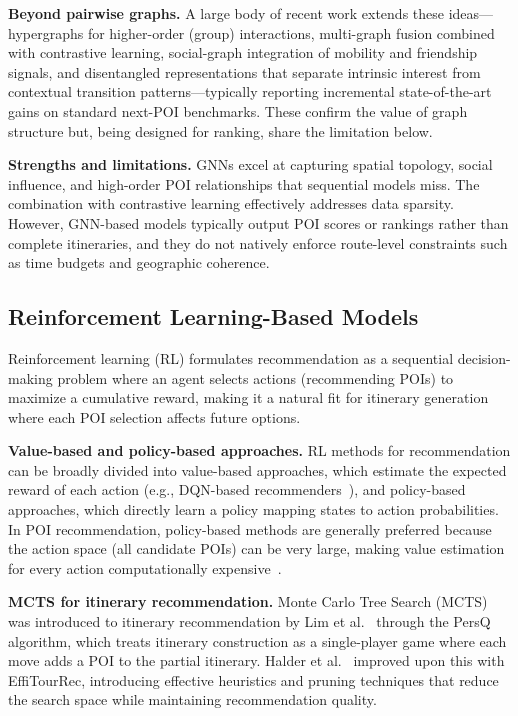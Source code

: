 \textbf{Beyond pairwise graphs.} A large body of recent work extends these ideas---hypergraphs for higher-order (group) interactions, multi-graph fusion combined with contrastive learning, social-graph integration of mobility and friendship signals, and disentangled representations that separate intrinsic interest from contextual transition patterns---typically reporting incremental state-of-the-art gains on standard next-POI benchmarks. These confirm the value of graph structure but, being designed for ranking, share the limitation below.

\textbf{Strengths and limitations.} GNNs excel at capturing spatial topology, social influence, and high-order POI relationships that sequential models miss. The combination with contrastive learning effectively addresses data sparsity. However, GNN-based models typically output POI scores or rankings rather than complete itineraries, and they do not natively enforce route-level constraints such as time budgets and geographic coherence.

\subsection{Reinforcement Learning-Based Models}
\label{sec:sota-dl-rl}

Reinforcement learning (RL) formulates recommendation as a sequential decision-making problem where an agent selects actions (recommending POIs) to maximize a cumulative reward, making it a natural fit for itinerary generation where each POI selection affects future options.

\textbf{Value-based and policy-based approaches.} RL methods for recommendation can be broadly divided into value-based approaches, which estimate the expected reward of each action (e.g., DQN-based recommenders~\cite{zheng2018drlnews}), and policy-based approaches, which directly learn a policy mapping states to action probabilities. In POI recommendation, policy-based methods are generally preferred because the action space (all candidate POIs) can be very large, making value estimation for every action computationally expensive~\cite{halder2022thesis}.

\textbf{MCTS for itinerary recommendation.} Monte Carlo Tree Search (MCTS) was introduced to itinerary recommendation by Lim et al.~\cite{lim2017persq} through the PersQ algorithm, which treats itinerary construction as a single-player game where each move adds a POI to the partial itinerary. Halder et al.~\cite{halder2022effitour} improved upon this with EffiTourRec, introducing effective heuristics and pruning techniques that reduce the search space while maintaining recommendation quality.

